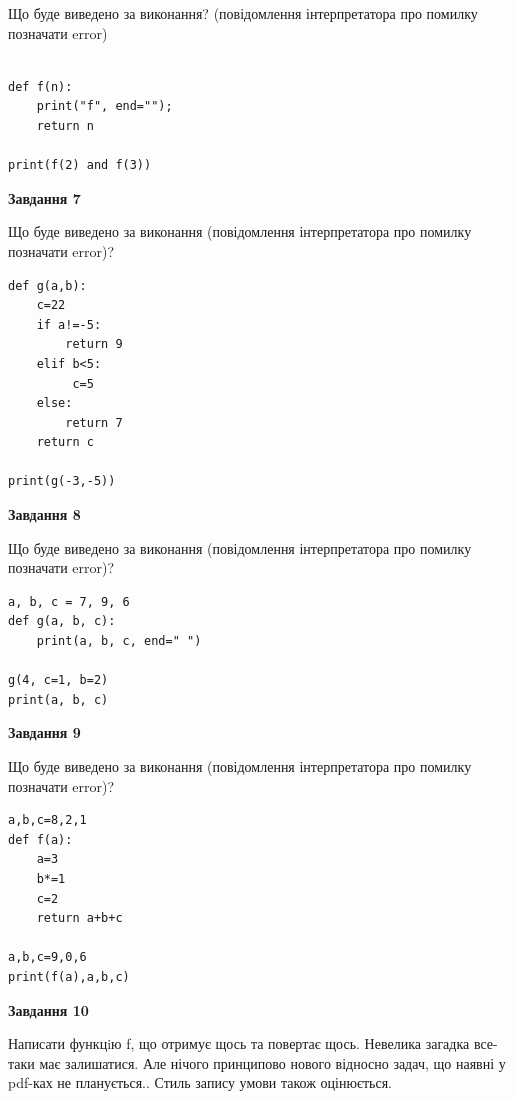 \documentclass[12pt, ukrainian]{article}
\begin{document}
{\begin {large}
Що буде виведено за виконання? (повідомлення інтерпретатора про помилку позначати error)\par
\begin{verbatim}

def f(n):
    print("f", end="");
    return n

print(f(2) and f(3))
\end{verbatim}

{\begin {center}\textbf{Завдання 7}\end {center}}

Що буде виведено за виконання (повідомлення інтерпретатора про помилку позначати error)?\par
\begin{verbatim}
def g(a,b):
    c=22
    if a!=-5:
        return 9
    elif b<5:
         c=5
    else: 
        return 7
    return c

print(g(-3,-5))
\end{verbatim}

{\begin {center}\textbf{Завдання 8}\end {center}}

Що буде виведено за виконання (повідомлення інтерпретатора про помилку позначати error)?\par
\begin{verbatim}
a, b, c = 7, 9, 6
def g(a, b, c):
    print(a, b, c, end=" ")

g(4, c=1, b=2)
print(a, b, c)
\end{verbatim}

{\begin {center}\textbf{Завдання 9}\end {center}}

Що буде виведено за виконання (повідомлення інтерпретатора про помилку позначати error)?\par
\begin{verbatim}
a,b,c=8,2,1
def f(a):
    a=3
    b*=1
    c=2
    return a+b+c

a,b,c=9,0,6
print(f(a),a,b,c)
\end{verbatim}

{\begin {center}\textbf{Завдання 10}\end {center}}


Написати функцiю f, що отримує щось та повертає щось. Невелика загадка все-таки має залишатися. Але нічого принципово нового відносно задач, що наявні у pdf-ках не планується.. Стиль запису умови також оцінюється.\par
\end {large}}
\newpage
\end{document}
